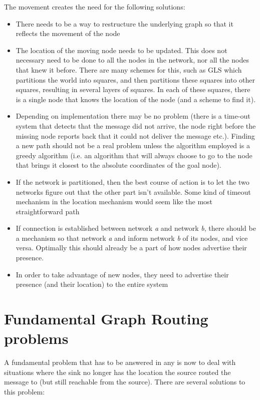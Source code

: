 \documentclass[letter, 12pt, english, draft]{article}
\begin{document}
The movement creates the need for the following solutions:
\begin{itemize}
\item There needs to be a way to restructure the underlying graph so that it reflects the movement of the node \cite{practical}
\item The location of the moving node needs to be updated. This does not necessary need to be done to all the nodes in the network, nor all the nodes that knew it before. There are many schemes for this, such as GLS \cite{scaleLocation} which partitions the world into squares, and then partitions these squares into other squares, resulting in several layers of squares. In each of these squares, there is a single node that knows the location of the node (and a scheme to find it).
\item Depending on implementation there may be no problem (there is a time-out system that detects that the message did not arrive, the node right before the missing node reports back that it could not deliver the message etc.). Finding a new path should not be a real problem unless the algorithm employed is a greedy algorithm (i.e. an algorithm that will always choose to go to the node that brings it closest to the absolute coordinates of the goal node).
\item If the network is partitioned, then the best course of action is to let the two networks figure out that the other part isn't available. Some kind of timeout mechanism in the location mechanism would seem like the most straightforward path
\item If connection is established between network \emph{a} and network \emph{b}, there should be a mechanism so that network \emph{a} and inform network \emph{b} of its nodes, and vice versa. Optimally this should already be a part of how nodes advertise their presence.
\item In order to take advantage of new nodes, they need to advertise their presence (and their location) to the entire system 
\end{itemize}

\section{Fundamental Graph Routing problems}

A fundamental problem that has to be answered in any \manet is now to deal with situations where the sink no longer has the location the source routed the message to (but still reachable from the source). There are several solutions to this problem:
\end{document}
